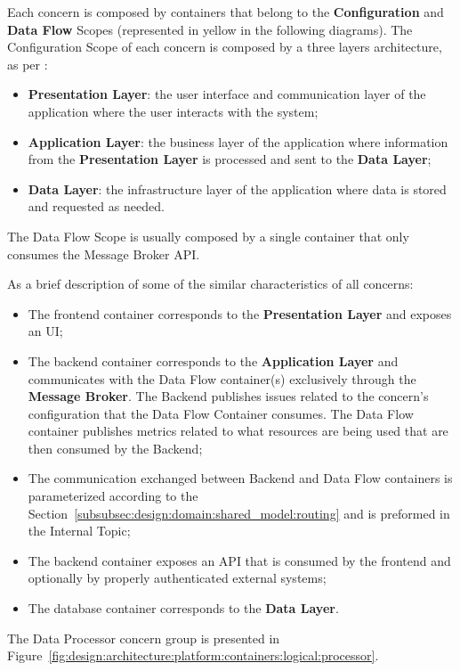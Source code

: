 Each concern is composed by containers that belong to the \textbf{Configuration} and \textbf{Data Flow} Scopes (represented in yellow in the following diagrams).
The Configuration Scope of each concern is composed by a three layers architecture, as per \cite{3tier}:

\begin{itemize}
   \item \textbf{Presentation Layer}: the user interface and communication layer of the application where the user interacts with the system;
   \item \textbf{Application Layer}: the business layer of the application where information from the \textbf{Presentation Layer} is processed and sent to the \textbf{Data Layer};
   \item \textbf{Data Layer}: the infrastructure layer of the application where data is stored and requested as needed.
\end{itemize}

The Data Flow Scope is usually composed by a single container that only consumes the Message Broker \gls{API}.

As a brief description of some of the similar characteristics of all concerns:

\begin{itemize}
   \item The frontend container corresponds to the \textbf{Presentation Layer} and exposes an \gls{UI};
   \item The backend container corresponds to the \textbf{Application Layer} and communicates with the Data Flow container(s) exclusively through the \textbf{Message Broker}. The Backend publishes issues related to the concern's configuration that the Data Flow Container consumes. The Data Flow container publishes metrics related to what resources are being used that are then consumed by the Backend;
   \item The communication exchanged between Backend and Data Flow containers is parameterized according to the Section~\ref{subsubsec:design:domain:shared_model:routing} and is preformed in the Internal Topic;
   \item The backend container exposes an \gls{API} that is consumed by the frontend and optionally by properly authenticated external systems;
   \item The database container corresponds to the \textbf{Data Layer}.
\end{itemize}

The Data Processor concern group is presented in Figure~\ref{fig:design:architecture:platform:containers:logical:processor}.

